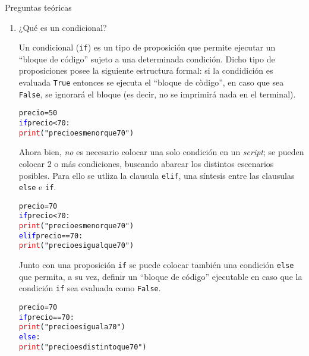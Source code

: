 \documentclass{article}
\begin{document}
\begin{center}
  \LARGE{Preguntas teóricas}    \\
\end{center}

\vspace{0.5cm}

\begin{enumerate}
\item ¿Qué es un condicional?

\par\hspace{5pt} Un condicional (\verb|if|) es un tipo de proposición que permite ejecutar un ``bloque de código'' sujeto a una determinada condición. Dicho tipo de proposiciones posee la siguiente estructura formal: si la condidición es evaluada \verb|True| entonces se ejecuta el ``bloque de còdigo'', en caso que sea \verb|False|, se ignorará el bloque (es decir, no se imprimirá nada en el terminal).  
\begin{tcolorbox}
\begin{alltt}
precio = 50
\textcolor{blue}{if} precio < 70:
    \textcolor{red}{print}("precio es menor que 70")
\end{alltt}        
\end{tcolorbox}

\par\hspace{5pt} Ahora bien, \emph{no} es necesario colocar una solo condición en un \emph{script}; se pueden colocar 2 o más condiciones, buscando abarcar los distintos escenarios posibles. Para ello se utliza la clausula \verb|elif|, una síntesis entre las clausulas \verb|else| e \verb|if|.
\begin{tcolorbox}
\begin{alltt}
precio = 70
\textcolor{blue}{if} precio < 70:
    \textcolor{red}{print}("precio es menor que 70")
\textcolor{blue}{elif} precio == 70:
    \textcolor{red}{print}("precio es igual que 70")
\end{alltt}        
\end{tcolorbox}
\par\hspace{5pt} Junto con una proposición \verb|if| se puede colocar también una condición \verb|else| que permita, a su vez, definir un ``bloque de código'' ejecutable en caso que la condición \verb|if| sea evaluada como \verb|False|.
\begin{tcolorbox}
  \begin{alltt}
  precio = 70
  \textcolor{blue}{if} precio == 70:
    \textcolor{red}{print}("precio es igual a  70")
  \textcolor{blue}{else}:
    \textcolor{red}{print}("precio es distinto que 70")
  \end{alltt}        
  \end{tcolorbox}
\vspace{0.5cm}


\end{enumerate}
\end{document}
